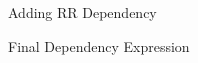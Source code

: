 \documentclass[notes xcolor=dvipsnames]{beamer}
\begin{document}
    \begin{frame}{Adding RR Dependency}

            \begin{figure}
            \end{figure}
            
            \begin{figure}
            \end{figure}
            
            
    \end{frame}

    \begin{frame}{Final Dependency Expression}

        \begin{figure}
        \end{figure}
        
    \end{frame}
\end{document}
